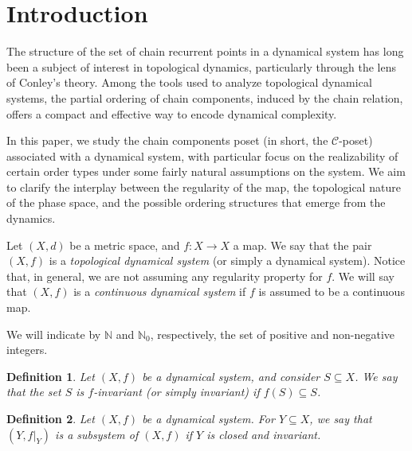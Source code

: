 \documentclass[pdflatex,sn-mathphys-num]{sn-jnl}
\theoremstyle{thmstyleone}%
\theoremstyle{thmstyletwo}%
\theoremstyle{thmstylethree}%
\newtheorem{defi}{Definition}%
\begin{document}



\maketitle

\section{Introduction}\label{sec:1}
The structure of the set of chain recurrent points in a dynamical system has long been a subject of interest in topological dynamics, particularly through the lens of Conley's theory. 
Among the tools used to analyze topological dynamical systems, the partial ordering of chain components, induced by the chain relation, offers a compact and effective way to encode dynamical complexity.

\noindent In this paper, we study the chain components poset (in short, the $\mathcal{C}$-poset) associated with a dynamical system, with particular focus on the realizability of certain order types under some fairly natural assumptions on the system. 
We aim to clarify the interplay between the regularity of the map, the topological nature of the phase space, and the possible ordering structures that emerge from the dynamics.


\noindent Let $(X,d)$ be a metric space, and $f:X\to X$ a map. 
We say that the pair $(X,f)$ is a \emph{topological dynamical system} (or simply a dynamical system). Notice that, in general, we are not assuming any regularity property for $f$. We will say that $(X,f)$ is a \emph{continuous dynamical system} if $f$ is assumed to be a continuous map.

\noindent We will indicate by $\mathbb{N}$ 
and $\mathbb{N}_0$, respectively, the set of positive and non-negative integers.


\begin{defi}\label{def_inv}
    Let $(X,f)$ be a dynamical system, and consider $S\subseteq X$. We say that the set $S$ is \emph{$f$-invariant} (or simply invariant) if $f(S)\subseteq S$.
\end{defi}
\begin{defi}\label{def_subsy}
    Let $(X,f)$ be a dynamical system. For $Y\subseteq X$, we say that $(Y,f\vert_Y)$ is a \emph{subsystem} of $(X,f)$ if $Y$ is closed and invariant. 
\end{defi}
\end{document}
